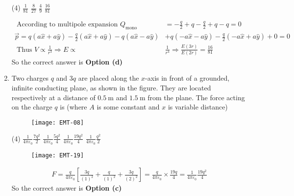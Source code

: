 \begin{enumerate}
 \begin{tasks}(4)
	\task[\textbf{a.}]$\frac{1}{81}$
	\task[\textbf{b.}]$\frac{8}{27}$
	\task[\textbf{c.}]$\frac{4}{9}$
	\task[\textbf{d.}] $\frac{16}{81}$	
\end{tasks}
\begin{answer}
	$$
	\begin{aligned}
	\text { According to multipole expansion } Q_{\text {mono }}&=-\frac{q}{2}+q-\frac{q}{2}+q-q=0\\
	\vec{p}=q(a \hat{x}+a \hat{y})-\frac{q}{2}(a \hat{x}+a \hat{y})-q(a \hat{x}-a \hat{y})&+q(-a \hat{x}-a \hat{y})-\frac{q}{2}(-a \hat{x}+a \hat{y})+0=0\\
	\text { Thus } V \propto \frac{1}{r^{3}} \Rightarrow E \propto& \frac{1}{r^{4}} \Rightarrow \frac{E(3 r)}{E(2 r)}=\frac{16}{81}
\end{aligned}
$$
So the correct answer is \textbf{Option (d)}
\end{answer}
\item  Two charges $q$ and $3 q$ are placed along the $x$-axis in front of a grounded, infinite conducting plane, as shown in the figure. They are located respectively at a distance of $0.5 \mathrm{~m}$ and $1.5 \mathrm{~m}$ from the plane. The force acting on the charge $q$ is
(where $A$ is some constant and $x$ is variable distance)
\begin{figure}[H]
	\centering
	\texttt{[image: EMT-08]}
\end{figure}
 \begin{tasks}(4)
	\task[\textbf{a.}] $\frac{1}{4 \pi \varepsilon_{0}} \frac{7 q^{2}}{2}$
	\task[\textbf{b.}]$\frac{1}{4 \pi \varepsilon_{0}} \frac{5 q^{2}}{4}$
	\task[\textbf{c.}]$\frac{1}{4 \pi \varepsilon_{0}} \frac{19 q^{2}}{4}$
	\task[\textbf{d.}] $\frac{1}{4 \pi \varepsilon_{0}} \frac{q^{2}}{2}$
\end{tasks}
\begin{answer}
	\begin{figure}[H]
		\centering
		\texttt{[image: EMT-19]}
	\end{figure}
	$$
	\begin{aligned}
	F=\frac{q}{4 \pi \varepsilon_{0}}\left[\frac{3 q}{(1)^{2}}+\frac{q}{(1)^{2}}+\frac{3 q}{(2)^{2}}\right]=\frac{q}{4 \pi \varepsilon_{0}} \times \frac{19 q}{4}=\frac{1}{4 \pi \varepsilon_{0}} \frac{19 q^{2}}{4}
\end{aligned}
$$
So the correct answer is \textbf{Option (c)}

\end{answer}
\end{enumerate}
